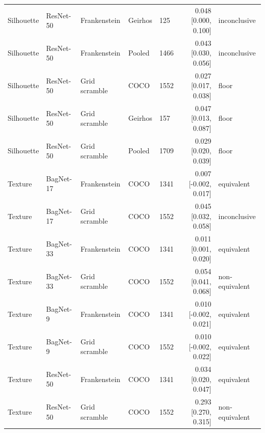 \begin{tabular}{lllllrl}
Silhouette & ResNet-50 & Frankenstein & Geirhos & 125 & 0.048 [0.000, 0.100] & inconclusive \\
Silhouette & ResNet-50 & Frankenstein & Pooled & 1466 & 0.043 [0.030, 0.056] & inconclusive \\
Silhouette & ResNet-50 & Grid scramble & COCO & 1552 & 0.027 [0.017, 0.038] & floor \\
Silhouette & ResNet-50 & Grid scramble & Geirhos & 157 & 0.047 [0.013, 0.087] & floor \\
Silhouette & ResNet-50 & Grid scramble & Pooled & 1709 & 0.029 [0.020, 0.039] & floor \\
Texture & BagNet-17 & Frankenstein & COCO & 1341 & 0.007 [-0.002, 0.017] & equivalent \\
Texture & BagNet-17 & Grid scramble & COCO & 1552 & 0.045 [0.032, 0.058] & inconclusive \\
Texture & BagNet-33 & Frankenstein & COCO & 1341 & 0.011 [0.001, 0.020] & equivalent \\
Texture & BagNet-33 & Grid scramble & COCO & 1552 & 0.054 [0.041, 0.068] & non-equivalent \\
Texture & BagNet-9 & Frankenstein & COCO & 1341 & 0.010 [-0.002, 0.021] & equivalent \\
Texture & BagNet-9 & Grid scramble & COCO & 1552 & 0.010 [-0.002, 0.022] & equivalent \\
Texture & ResNet-50 & Frankenstein & COCO & 1341 & 0.034 [0.020, 0.047] & equivalent \\
Texture & ResNet-50 & Grid scramble & COCO & 1552 & 0.293 [0.270, 0.315] & non-equivalent \\
\hline
\end{tabular}